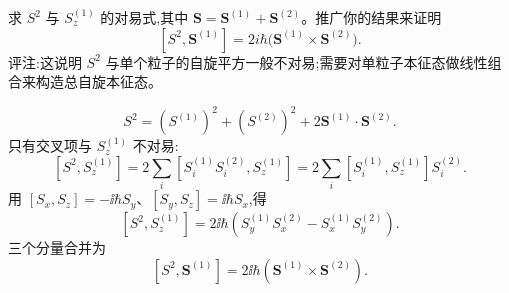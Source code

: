 \begin{question}
求 $S^2$ 与 $S_z^{(1)}$ 的对易式,其中 $\mathbf S=\mathbf S^{(1)}+\mathbf S^{(2)}$。推广你的结果来证明
\[
[S^2,\mathbf S^{(1)}]=2i\hbar\bigl(\mathbf S^{(1)}\times\mathbf S^{(2)}\bigr).
\]
评注:这说明 $S^2$ 与单个粒子的自旋平方一般不对易;需要对单粒子本征态做线性组合来构造总自旋本征态。
\end{question}
\begin{solution}

\[
S^2=(S^{(1)})^2+(S^{(2)})^2+2\mathbf S^{(1)}\cdot\mathbf S^{(2)}.
\]
只有交叉项与 $S_z^{(1)}$ 不对易:
\[
[S^2,S_z^{(1)}]=2\sum_i[S_i^{(1)}S_i^{(2)},S_z^{(1)}]
=2\sum_i[S_i^{(1)},S_z^{(1)}]S_i^{(2)}.
\]
用 $[S_x,S_z]=-\ii\hbar S_y$、$[S_y,S_z]=\ii\hbar S_x$,得
\[
[S^2,S_z^{(1)}]=2\ii\hbar(S_y^{(1)}S_x^{(2)}-S_x^{(1)}S_y^{(2)}).
\]
三个分量合并为
\[
[S^2,\mathbf S^{(1)}]=2\ii\hbar(\mathbf S^{(1)}\times\mathbf S^{(2)}).
\]

\end{solution}

